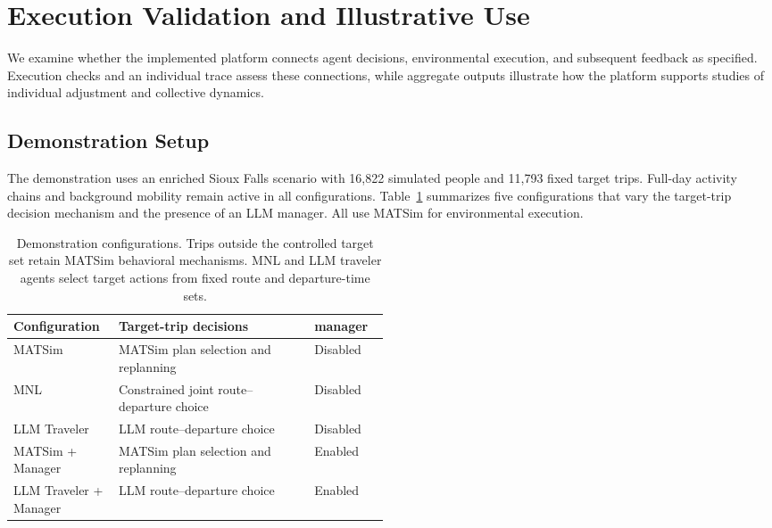 \section{Execution Validation and Illustrative Use}
\label{sec:validation}

We examine whether the implemented platform connects agent
decisions, environmental execution, and subsequent feedback as
specified. Execution checks and an individual trace assess
these connections, while aggregate outputs illustrate how the
platform supports studies of individual adjustment and
collective dynamics.


\subsection{Demonstration Setup}
\label{sec:demonstration-setup}

The demonstration uses an enriched Sioux Falls scenario with
16,822 simulated people and 11,793 fixed target trips. Full-day
activity chains and background mobility remain active in all
configurations. Table~\ref{tab:conditions} summarizes five
configurations that vary the target-trip decision mechanism
and the presence of an LLM manager. All use MATSim for
environmental execution.

\begin{table}[htbp]
    \centering
    \small
    \caption{Demonstration configurations. Trips outside the
    controlled target set retain MATSim behavioral mechanisms.
    MNL and LLM traveler agents select target actions from
    fixed route and departure-time sets.}
    \label{tab:conditions}
    \renewcommand{\arraystretch}{1.15}
    \begin{tabularx}{\linewidth}{
        @{}
        >{\raggedright\arraybackslash}p{0.29\linewidth}
        >{\raggedright\arraybackslash}X
        >{\raggedright\arraybackslash}p{0.20\linewidth}
        @{}
    }
        \toprule
        Configuration & Target-trip decisions & manager \\
        \midrule
        MATSim
        & MATSim plan selection and replanning
        & Disabled \\

        MNL
        & Constrained joint route--departure choice
        & Disabled \\

        LLM Traveler
        & LLM route--departure choice
        & Disabled \\

        MATSim + Manager
        & MATSim plan selection and replanning
        & Enabled \\

        LLM Traveler + Manager
        & LLM route--departure choice
        & Enabled \\
        \bottomrule
    \end{tabularx}
\end{table}

